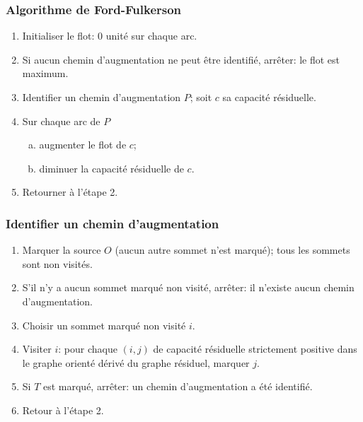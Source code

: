 \documentclass[usepdftitle=false]{beamer}
\begin{document}
\begin{frame}
\frametitle{Algorithme de Ford-Fulkerson}

\begin{enumerate}
	\item 
	Initialiser le flot: 0 unité sur chaque arc.
	\item
	Si aucun chemin d'augmentation ne peut être identifié, arrêter: le flot est maximum.
	\item
	Identifier un chemin d'augmentation $P$; soit $c$ sa capacité résiduelle.
	\item
	Sur chaque arc de $P$
	\begin{enumerate}[(a)]
		\item
		augmenter le flot de $c$;
		\item
		diminuer la capacité résiduelle de $c$.
	\end{enumerate}
	\item
	Retourner à l'étape 2.
\end{enumerate}

\end{frame}

\begin{frame}
\frametitle{Identifier un chemin d'augmentation}

\begin{enumerate}
	\item
	Marquer la source $O$ (aucun autre sommet n'est marqué); tous les sommets sont non visités.
	\item
	S'il n'y a aucun sommet marqué non visité, arrêter: il n'existe aucun chemin d'augmentation.
	\item
	Choisir un sommet marqué non visité $i$.
	\item
	Visiter $i$: pour chaque $(i,j)$ de capacité résiduelle strictement positive dans le graphe orienté dérivé du graphe résiduel, marquer $j$.
	\item
	Si $T$ est marqué, arrêter: un chemin d'augmentation a été identifié.
	\item
	Retour à l'étape 2.
\end{enumerate}

\end{frame}
\end{document}
